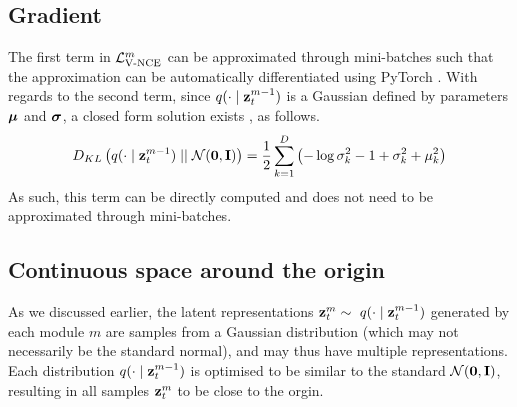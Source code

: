 	\subsection{Gradient}
		The first term in $\mathcal{L}_{\text{V-NCE}}^m$ can be approximated through mini-batches such that the approximation can be automatically differentiated using PyTorch \cite{paszkeAutomaticDifferentiationPyTorch2017}. With regards to the second term, since $q(\cdot \mid \mathbf{z}_t^{m-1})$ is a Gaussian defined by parameters $\bm{\mu}$ and $\bm{\sigma}$, a closed form solution exists \cite{kingmaAutoEncodingVariationalBayes2022}, as follows.
		\begin{equation} %
			\latentspaceconstraintgim = \latentspaceconstraintclosedformNoI
		\end{equation}
		As such, this term can be directly computed and does not need to be approximated through mini-batches.
	
		
	
	\subsection{Continuous space around the origin} \label{cha:contin_space}
	
		
		
			As we discussed earlier, the latent representations $\mathbf{z}_t^m \sim ~ q(\cdot \mid \mathbf{z}_t^{m-1})$ generated by each module $m$ are samples from a Gaussian distribution (which may not necessarily be the standard normal), and may thus have multiple representations.
			Each distribution $q(\cdot \mid \mathbf{z}_t^{m-1})$ is optimised to be similar to the standard $\mathcal{N}(\bm{\mathbf{0}}, \mathbf{I})$, resulting in all samples $\mathbf{z}_t^m$ to be close to the orgin.
	
